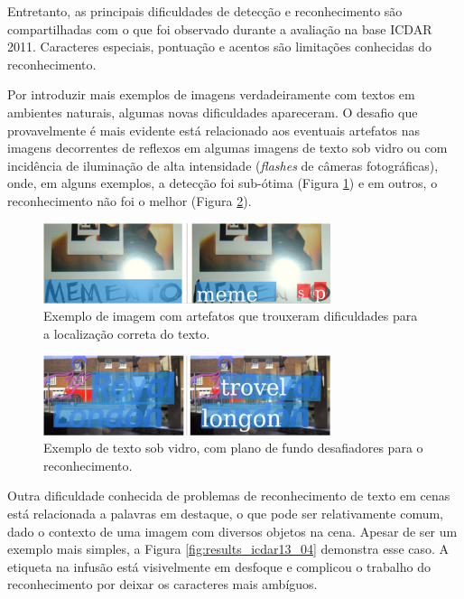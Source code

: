 Entretanto, as principais dificuldades de detecção e reconhecimento são compartilhadas com o que foi observado durante a avaliação 
na base ICDAR 2011. Caracteres especiais, pontuação e acentos são limitações conhecidas do reconhecimento.

Por introduzir mais exemplos de imagens verdadeiramente com textos em ambientes naturais, algumas novas dificuldades apareceram. 
O desafio que provavelmente é mais evidente está relacionado aos eventuais artefatos nas imagens decorrentes de reflexos em 
algumas imagens de texto sob vidro ou com incidência de iluminação de alta intensidade (\textit{flashes} de câmeras fotográficas), 
onde, em alguns exemplos, a detecção foi sub-ótima (Figura \ref{fig:results_icdar13_03}) e em outros, o reconhecimento não foi 
o melhor (Figura \ref{fig:results_icdar13_02}).

\begin{figure}
    \centering
    \includegraphics[width=0.75\textwidth]{figs/resultados-icdar13-03.png}
    \caption{Exemplo de imagem com artefatos que trouxeram dificuldades para a localização correta do texto.}
    \label{fig:results_icdar13_03}
\end{figure}

\begin{figure}
    \centering
    \includegraphics[width=0.75\textwidth]{figs/resultados-icdar13-02.png}
    \caption{Exemplo de texto sob vidro, com plano de fundo desafiadores para o reconhecimento.}
    \label{fig:results_icdar13_02}
\end{figure}

Outra dificuldade conhecida de problemas de reconhecimento de texto em cenas está relacionada a palavras em destaque, o que pode 
ser relativamente comum, dado o contexto de uma imagem com diversos objetos na cena. Apesar de ser um exemplo mais simples, a 
Figura \ref{fig:results_icdar13_04} demonstra esse caso. A etiqueta na infusão está visivelmente em desfoque e complicou o 
trabalho do reconhecimento por deixar os caracteres mais ambíguos.

